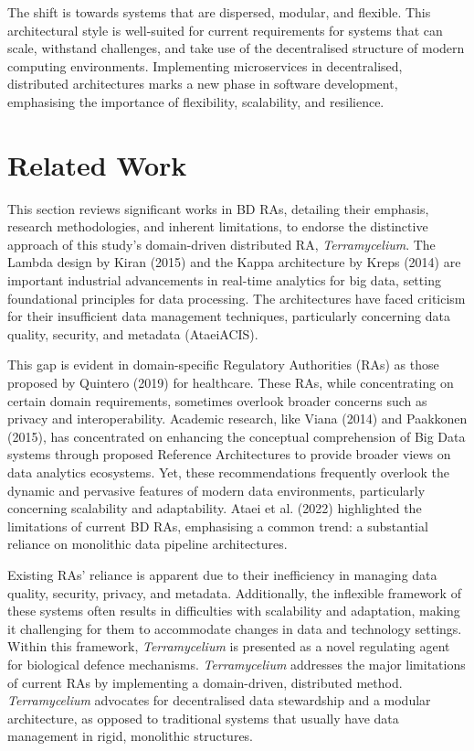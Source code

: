 \documentclass[preprint,12pt]{elsarticle}
\begin{document}
The shift is towards systems that are dispersed, modular, and flexible. This architectural style is well-suited for current requirements for systems that can scale, withstand challenges, and take use of the decentralised structure of modern computing environments. Implementing microservices in decentralised, distributed architectures marks a new phase in software development, emphasising the importance of flexibility, scalability, and resilience.


\section{Related Work}
\label{sec:related_work}

This section reviews significant works in BD RAs, detailing their emphasis, research methodologies, and inherent limitations, to endorse the distinctive approach of this study's domain-driven distributed RA, \textit{Terramycelium}. The Lambda design by Kiran (2015) and the Kappa architecture by Kreps (2014) are important industrial advancements in real-time analytics for big data, setting foundational principles for data processing. The architectures have faced criticism for their insufficient data management techniques, particularly concerning data quality, security, and metadata (AtaeiACIS). 

This gap is evident in domain-specific Regulatory Authorities (RAs) as those proposed by Quintero (2019) for healthcare. These RAs, while concentrating on certain domain requirements, sometimes overlook broader concerns such as privacy and interoperability. Academic research, like Viana (2014) and Paakkonen (2015), has concentrated on enhancing the conceptual comprehension of Big Data systems through proposed Reference Architectures to provide broader views on data analytics ecosystems. Yet, these recommendations frequently overlook the dynamic and pervasive features of modern data environments, particularly concerning scalability and adaptability. Ataei et al. (2022) highlighted the limitations of current BD RAs, emphasising a common trend: a substantial reliance on monolithic data pipeline architectures. 

Existing RAs' reliance is apparent due to their inefficiency in managing data quality, security, privacy, and metadata. Additionally, the inflexible framework of these systems often results in difficulties with scalability and adaptation, making it challenging for them to accommodate changes in data and technology settings. Within this framework, \textit{Terramycelium} is presented as a novel regulating agent for biological defence mechanisms. \textit{Terramycelium} addresses the major limitations of current RAs by implementing a domain-driven, distributed method. \textit{Terramycelium} advocates for decentralised data stewardship and a modular architecture, as opposed to traditional systems that usually have data management in rigid, monolithic structures. 
\end{document}
